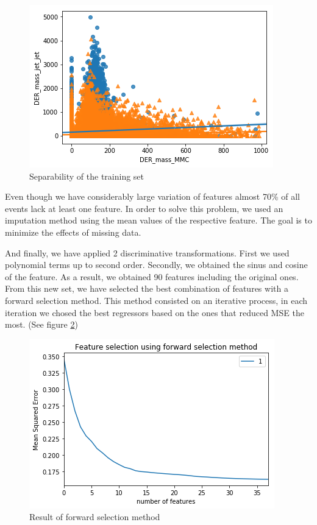 \documentclass[10pt,conference,compsocconf]{IEEEtran}
\begin{document}
\begin{tiny}
		\begin{figure}[b]
			\includegraphics[scale=0.5]{separ.png}   
			\caption{Separability of the training set }
			\label{fig1}    
		\end{figure}
\end{tiny}

Even though we have considerably large variation of features almost 70\% of all events lack at least one feature. In order to solve this problem, we used an imputation method using the mean values of the respective feature. The goal is to minimize the effects of missing data. 

And finally, we have applied 2 discriminative transformations. First we used polynomial terms up to second order. Secondly, we obtained the sinus and cosine of the feature. As a result, we obtained 90 features including the original ones. From this new set, we have selected the best combination of features with a forward selection method. This method consisted on an iterative process, in each iteration we chosed the best regressors based on the ones that reduced MSE the most. (See figure \ref{fig2})
\begin{tiny}
	\begin{figure}[t]
		\includegraphics[scale=0.5]{Mse.png}   
		\caption{Result of forward selection method }
		\label{fig2}    
	\end{figure}
\end{tiny}
\end{document}
